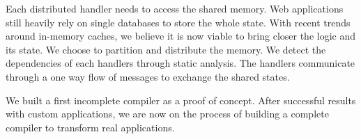 Each distributed handler needs to access the shared memory.
Web applications still heavily rely on single databases to store the whole state.
With recent trends around in-memory caches, we believe it is now viable to bring closer the logic and its state.
We choose to partition and distribute the memory.
We detect the dependencies of each handlers through static analysis.
The handlers communicate through a one way flow of messages to exchange the shared states.

We built a first incomplete compiler as a proof of concept.
After successful results with custom applications, we are now on the process of building a complete compiler to transform real applications.